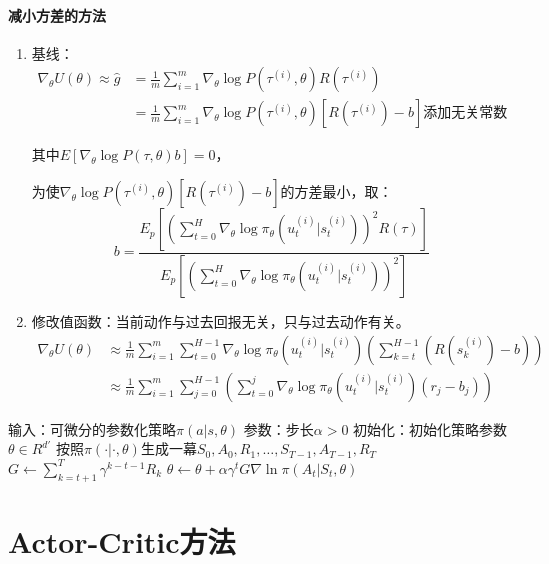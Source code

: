 \documentclass[
12pt, %
a4paper, 
oneside, %
headinclude,footinclude, %
]{scrartcl}
\begin{document}
\paragraph{减小方差的方法}
\begin{enumerate}
\item 基线：
\begin{align*}
\nabla_\theta U(\theta) \approx \hat{g} &= \frac{1}{m}\sum_{i = 1}^{m} \nabla_\theta \log P(\tau^{(i)}, \theta)R(\tau^{(i)}) \\
&= \frac{1}{m}\sum_{i = 1}^{m} \nabla_\theta \log P(\tau^{(i)}, \theta)[R(\tau^{(i)}) - b] \text{添加无关常数}
\end{align*}

其中$ E[\nabla_\theta\log P(\tau, \theta)b] = 0 $，

为使$ \nabla_\theta\log P(\tau^{(i)}, \theta)[R(\tau^{(i)}) - b] $的方差最小，取：
$$ b = \frac{E_p[(\sum_{t = 0}^{H} \nabla_\theta\log\pi_\theta(u_t^{(i)}|s_t^{(i)}))^2 R(\tau)]}{E_p[(\sum_{t = 0}^{H} \nabla_\theta\log\pi_\theta(u_t^{(i)}|s_t^{(i)}))^2]} $$
\item 修改值函数：当前动作与过去回报无关，只与过去动作有关。
\begin{align*}
\nabla_\theta U(\theta) &\approx \frac{1}{m}\sum_{i = 1}^{m}\sum_{t = 0}^{H - 1}\nabla_\theta\log\pi_\theta(u_t^{(i)}|s_t^{(i)})(\sum_{k = t}^{H - 1}(R(s_k^{(i)}) - b)) \\
&\approx \frac{1}{m}\sum_{i = 1}^{m}\sum_{j = 0}^{H - 1}(\sum_{t = 0}^{j}\nabla_\theta\log\pi_\theta(u_t^{(i)}|s_t^{(i)})(r_j - b_j))
\end{align*}
\end{enumerate}
\begin{myalgorithm}[REINFORCE]
\State 输入：可微分的参数化策略$ \pi(a|s, \theta) $
\State 参数：步长$ \alpha > 0 $
\State 初始化：初始化策略参数$ \theta \in R^{d'} $
\Loop {}
\State 按照$ \pi(\cdot|\cdot, \theta) $生成一幕$ S_0, A_0, R_1, \ldots, S_{T - 1}, A_{T - 1}, R_T $
\State $ G \gets \sum_{k = t + 1}^{T} \gamma^{k - t - 1}R_k $ 
\State $ \theta \gets \theta + \alpha\gamma^t G \nabla \ln \pi(A_t|S_t, \theta) $
\EndFor
\EndLoop
\end{myalgorithm}
\section{Actor-Critic方法}
\end{document}
